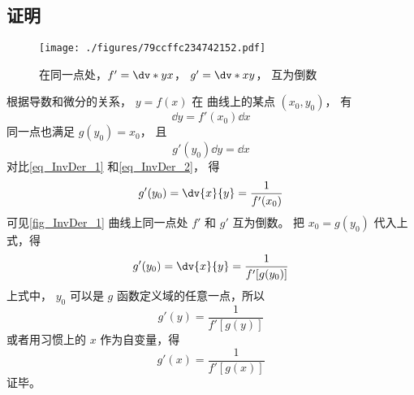 \subsection{证明}
\begin{figure}[ht]
\centering
\texttt{[image: ./figures/79ccffc234742152.pdf]}
\caption{在同一点处，$f'=\dv*{y}{x}$， $g'=\dv*{x}{y}$， 互为倒数}\label{fig_InvDer_1}
\end{figure}
根据导数和微分的关系， $y = f(x)$ 在 曲线上的某点 $(x_0, y_0)$， 有
 \begin{equation}\label{eq_InvDer_1}
\dd{y} = f'(x_0) \dd{x}
\end{equation}
同一点也满足 $g(y_0) = x_0$， 且
 \begin{equation}\label{eq_InvDer_2}
g'(y_0)\dd{y} = \dd{x}
\end{equation}
对比\autoref{eq_InvDer_1} 和\autoref{eq_InvDer_2}， 得
\begin{equation}
g'(y_0) = \dv{x}{y} = \frac{1}{f'(x_0)}
\end{equation}
可见\autoref{fig_InvDer_1} 曲线上同一点处 $f'$ 和 $g'$ 互为倒数。 把 ${x_0} = g(y_0)$ 代入上式，得
\begin{equation}
g'(y_0) = \dv{x}{y} = \frac{1}{f'[g(y_0)]}
\end{equation} 
上式中， $y_0$ 可以是 $g$ 函数定义域的任意一点，所以
\begin{equation}
g'(y) = \frac{1}{f'[g(y)]}
\end{equation} 
或者用习惯上的 $x$ 作为自变量，得
\begin{equation}
g'(x) = \frac{1}{f'[g(x)]}
\end{equation}
证毕。
















